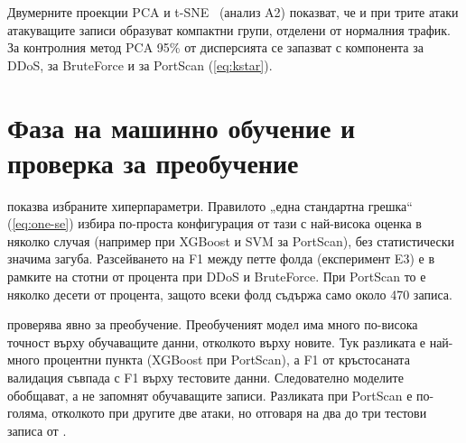Двумерните проекции PCA и t-SNE~\cite{vandermaaten2008} (анализ A2) показват, че и при трите атаки атакуващите записи образуват компактни групи, отделени от нормалния трафик. За контролния метод PCA 95\% от дисперсията се запазват с  компонента за DDoS,  за BruteForce и  за PortScan (\cref{eq:kstar}).

\section{Фаза на машинно обучение и проверка за преобучение}\label{sec:r-ml}

 показва избраните хиперпараметри. Правилото „една стандартна грешка“ (\cref{eq:one-se}) избира по-проста конфигурация от тази с най-висока оценка в няколко случая (например при XGBoost и SVM за PortScan), без статистически значима загуба. Разсейването на F1 между петте фолда (експеримент E3) е в рамките на стотни от процента при DDoS и BruteForce. При PortScan то е няколко десети от процента, защото всеки фолд съдържа само около 470 записа.

\begin{table}[H]
\centering\small
\caption{Резултат от GridSearchCV: избрани хиперпараметри и CV F1}\label{tab:cv}

\vspace{2pt}
\end{table}

 проверява явно за преобучение. Преобученият модел има много по-висока точност върху обучаващите данни, отколкото върху новите. Тук разликата е най-много  процентни пункта (XGBoost при PortScan), а F1 от кръстосаната валидация съвпада с F1 върху тестовите данни. Следователно моделите обобщават, а не запомнят обучаващите записи. Разликата при PortScan е по-голяма, отколкото при другите две атаки, но отговаря на два до три тестови записа от .

\begin{table}[H]
\centering\small
\caption{Проверка за преобучение: обучение, кръстосана валидация и тест}\label{tab:overfit}

\vspace{2pt}
\end{table}

